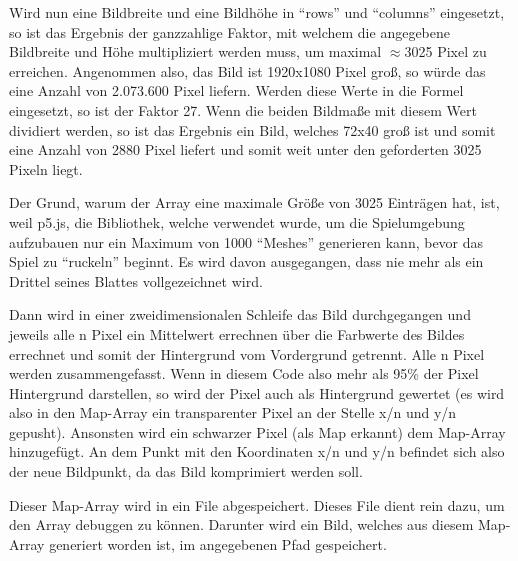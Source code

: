 Wird nun eine Bildbreite und eine Bildhöhe in ``rows'' und ``columns'' eingesetzt, so ist das Ergebnis der ganzzahlige Faktor, mit welchem die angegebene Bildbreite und Höhe multipliziert werden muss, um maximal \(\approx\)3025 Pixel zu erreichen.
Angenommen also, das Bild ist 1920x1080 Pixel groß, so würde das eine Anzahl von 2.073.600 Pixel liefern. Werden diese Werte in die Formel eingesetzt, so ist der Faktor 27. Wenn die beiden Bildmaße mit diesem Wert dividiert werden, so ist das Ergebnis ein Bild, welches 72x40 groß ist und somit eine Anzahl von 2880 Pixel liefert und somit weit unter den geforderten 3025 Pixeln liegt.

Der Grund, warum der Array eine maximale Größe von 3025 Einträgen hat, ist, weil p5.js, die Bibliothek, welche verwendet wurde, um die Spielumgebung aufzubauen nur ein Maximum von 1000 ``Meshes'' generieren kann, bevor das Spiel zu ``ruckeln'' beginnt. Es wird davon ausgegangen, dass nie mehr als ein Drittel seines Blattes vollgezeichnet wird.

Dann wird in einer zweidimensionalen Schleife das Bild durchgegangen und jeweils alle n Pixel ein Mittelwert errechnen über die Farbwerte des Bildes errechnet und somit der Hintergrund vom Vordergrund getrennt. Alle n Pixel werden zusammengefasst. Wenn in diesem Code also mehr als 95\% der Pixel Hintergrund darstellen, so wird der Pixel auch als Hintergrund gewertet (es wird also in den Map-Array ein transparenter Pixel an der Stelle x/n und y/n gepusht). Ansonsten wird ein schwarzer Pixel (als Map erkannt) dem Map-Array hinzugefügt. An dem Punkt mit den Koordinaten x/n und y/n befindet sich also der neue Bildpunkt, da das Bild komprimiert werden soll.

Dieser Map-Array wird in ein File abgespeichert. Dieses File dient rein dazu, um den Array debuggen zu können. Darunter wird ein Bild, welches aus diesem Map-Array generiert worden ist, im angegebenen Pfad gespeichert.

